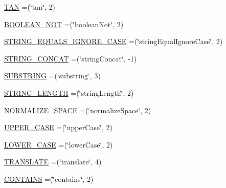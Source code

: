 \begin{DoxyCompactItemize}
\item 
\hyperlink{enumorg_1_1semanticweb_1_1owlapi_1_1vocab_1_1_s_w_r_l_built_ins_vocabulary_a39d86c1798029e3478e5a7b28be9b534}{T\-A\-N} =(\char`\"{}tan\char`\"{}, 2)
\item 
\hyperlink{enumorg_1_1semanticweb_1_1owlapi_1_1vocab_1_1_s_w_r_l_built_ins_vocabulary_a911bca837cce2ea00e5508284259bd7c}{B\-O\-O\-L\-E\-A\-N\-\_\-\-N\-O\-T} =(\char`\"{}boolean\-Not\char`\"{}, 2)
\item 
\hyperlink{enumorg_1_1semanticweb_1_1owlapi_1_1vocab_1_1_s_w_r_l_built_ins_vocabulary_ab121c48138b513e2dbbaf4830d88cc35}{S\-T\-R\-I\-N\-G\-\_\-\-E\-Q\-U\-A\-L\-S\-\_\-\-I\-G\-N\-O\-R\-E\-\_\-\-C\-A\-S\-E} =(\char`\"{}string\-Equal\-Ignore\-Case\char`\"{}, 2)
\item 
\hyperlink{enumorg_1_1semanticweb_1_1owlapi_1_1vocab_1_1_s_w_r_l_built_ins_vocabulary_ab49e507bc13600ebe6fb4c548068ab19}{S\-T\-R\-I\-N\-G\-\_\-\-C\-O\-N\-C\-A\-T} =(\char`\"{}string\-Concat\char`\"{}, -\/1)
\item 
\hyperlink{enumorg_1_1semanticweb_1_1owlapi_1_1vocab_1_1_s_w_r_l_built_ins_vocabulary_a521dc71f6f6c563b93a93c794b4a4314}{S\-U\-B\-S\-T\-R\-I\-N\-G} =(\char`\"{}substring\char`\"{}, 3)
\item 
\hyperlink{enumorg_1_1semanticweb_1_1owlapi_1_1vocab_1_1_s_w_r_l_built_ins_vocabulary_a5f9724d948b39398d954e386dfdc30ac}{S\-T\-R\-I\-N\-G\-\_\-\-L\-E\-N\-G\-T\-H} =(\char`\"{}string\-Length\char`\"{}, 2)
\item 
\hyperlink{enumorg_1_1semanticweb_1_1owlapi_1_1vocab_1_1_s_w_r_l_built_ins_vocabulary_aa6548654a027ddbe619e5da92bfe3ebd}{N\-O\-R\-M\-A\-L\-I\-Z\-E\-\_\-\-S\-P\-A\-C\-E} =(\char`\"{}normalize\-Space\char`\"{}, 2)
\item 
\hyperlink{enumorg_1_1semanticweb_1_1owlapi_1_1vocab_1_1_s_w_r_l_built_ins_vocabulary_aad1adb546e78082d12fb2ca21f569981}{U\-P\-P\-E\-R\-\_\-\-C\-A\-S\-E} =(\char`\"{}upper\-Case\char`\"{}, 2)
\item 
\hyperlink{enumorg_1_1semanticweb_1_1owlapi_1_1vocab_1_1_s_w_r_l_built_ins_vocabulary_aa48f0f065dc54f42a59bc8ab57954075}{L\-O\-W\-E\-R\-\_\-\-C\-A\-S\-E} =(\char`\"{}lower\-Case\char`\"{}, 2)
\item 
\hyperlink{enumorg_1_1semanticweb_1_1owlapi_1_1vocab_1_1_s_w_r_l_built_ins_vocabulary_a1bab74e9ab73fcf4c5b04f70bb8d841c}{T\-R\-A\-N\-S\-L\-A\-T\-E} =(\char`\"{}translate\char`\"{}, 4)
\item 
\hyperlink{enumorg_1_1semanticweb_1_1owlapi_1_1vocab_1_1_s_w_r_l_built_ins_vocabulary_ab06fb866e3a356e4a7be8663324bd606}{C\-O\-N\-T\-A\-I\-N\-S} =(\char`\"{}contains\char`\"{}, 2)

\end{DoxyCompactItemize}
